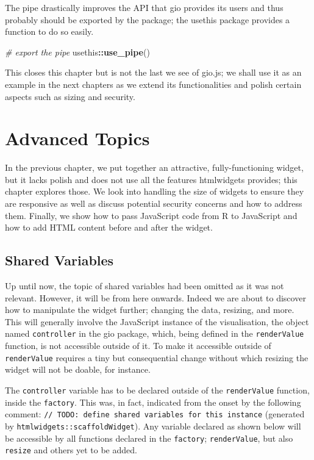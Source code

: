 \documentclass[10pt,]{krantz}
\makeatletter
\newenvironment{Shaded}{\begin{snugshade}}{\end{snugshade}}
\newcommand{\CommentTok}[1]{\textcolor[rgb]{0.37,0.37,0.37}{\textit{#1}}}
\newcommand{\KeywordTok}[1]{\textcolor[rgb]{0.27,0.27,0.27}{\textbf{#1}}}
\newcommand{\NormalTok}[1]{#1}
\newcommand{\OperatorTok}[1]{\textcolor[rgb]{0.43,0.43,0.43}{\textbf{#1}}}
\newenvironment{kframe}{%
\medskip{}
\setlength{\fboxsep}{.8em}
 \def\at@end@of@kframe{}%
 \ifinner\ifhmode%
  \def\at@end@of@kframe{\end{minipage}}%
  \begin{minipage}{\columnwidth}%
 \fi\fi%
 \def\FrameCommand##1{\hskip\@totalleftmargin \hskip-\fboxsep
 \colorbox{shadecolor}{##1}\hskip-\fboxsep
     \hskip-\linewidth \hskip-\@totalleftmargin \hskip\columnwidth}%
 \MakeFramed {\advance\hsize-\width
   \@totalleftmargin\z@ \linewidth\hsize
   \@setminipage}}%
 {\par\unskip\endMakeFramed%
 \at@end@of@kframe}
\renewenvironment{Shaded}{\begin{kframe}}{\end{kframe}}
\makeatother
\begin{document}
The pipe drastically improves the API that gio provides its users and thus probably should be exported by the package; the usethis package provides a function to do so easily.

\begin{Shaded}
\begin{Highlighting}[]
\CommentTok{# export the pipe}
\NormalTok{usethis}\OperatorTok{::}\KeywordTok{use_pipe}\NormalTok{()}
\end{Highlighting}
\end{Shaded}

This closes this chapter but is not the last we see of gio.js; we shall use it as an example in the next chapters as we extend its functionalities and polish certain aspects such as sizing and security.

\hypertarget{widgets-adv}{%
\chapter{Advanced Topics}\label{widgets-adv}}

In the previous chapter, we put together an attractive, fully-functioning widget, but it lacks polish and does not use all the features htmlwidgets provides; this chapter explores those. We look into handling the size of widgets to ensure they are responsive as well as discuss potential security concerns and how to address them. Finally, we show how to pass JavaScript code from R to JavaScript and how to add HTML content before and after the widget.

\hypertarget{widgets-adv-shared}{%
\section{Shared Variables}\label{widgets-adv-shared}}

Up until now, the topic of shared variables had been omitted as it was not relevant. However, it will be from here onwards. Indeed we are about to discover how to manipulate the widget further; changing the data, resizing, and more. This will generally involve the JavaScript instance of the visualisation, the object named \texttt{controller} in the gio package, which, being defined in the \texttt{renderValue} function, is not accessible outside of it. To make it accessible outside of \texttt{renderValue} requires a tiny but consequential change without which resizing the widget will not be doable, for instance.

The \texttt{controller} variable has to be declared outside of the \texttt{renderValue} function, inside the \texttt{factory}. This was, in fact, indicated from the onset by the following comment: \texttt{//\ TODO:\ define\ shared\ variables\ for\ this\ instance} (generated by \texttt{htmlwidgets::scaffoldWidget}). Any variable declared as shown below will be accessible by all functions declared in the \texttt{factory}; \texttt{renderValue}, but also \texttt{resize} and others yet to be added.
\end{document}
